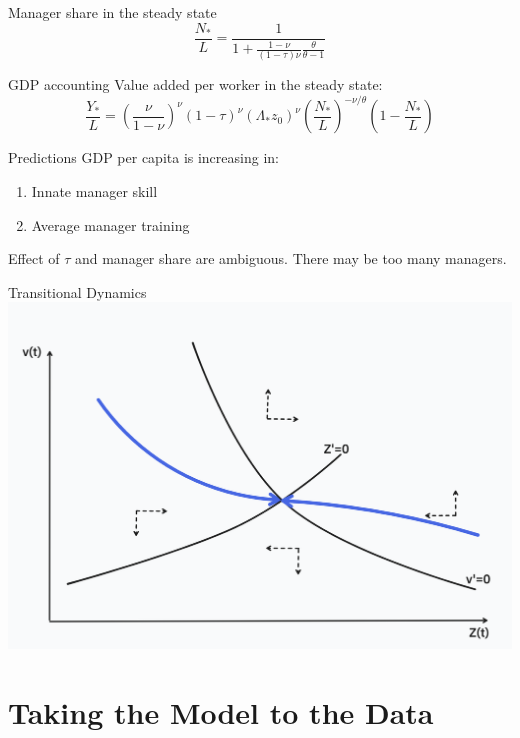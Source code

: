 \documentclass[
  ignorenonframetext,
  aspectratio=1610,
]{beamer}
\providecommand{\tightlist}{%
  \setlength{\itemsep}{0pt}\setlength{\parskip}{0pt}}
\begin{document}
\begin{frame}{Manager share in the steady state}
\protect\hypertarget{manager-share-in-the-steady-state}{}
\[
\frac{N_*}{L} = \frac 1{1+  
\frac {1-\nu}{(1-\tau)\nu}
\frac {\theta}{\theta - 1}}
\]
\end{frame}

\begin{frame}{GDP accounting}
\protect\hypertarget{gdp-accounting}{}
Value added per worker in the steady state: \[
\frac{Y_*}{L} = 
\left(\frac{\nu}{1-\nu} \right)^\nu
(1-\tau)^\nu
(\Lambda_* z_0)^\nu
\left(\frac {N_*}{L}
\right)^{-\nu/\theta}
\left(1-\frac {N_*}{L}
\right)
\]
\end{frame}

\begin{frame}{Predictions}
\protect\hypertarget{predictions}{}
GDP per capita is increasing in:

\begin{enumerate}
\tightlist
\item
  Innate manager skill
\item
  Average manager training
\end{enumerate}

Effect of \(\tau\) and manager share are ambiguous. There may be too
many managers.
\end{frame}

\begin{frame}{Transitional Dynamics}
\protect\hypertarget{transitional-dynamics}{}
\includegraphics{fig/phase1.png}
\end{frame}

\section{Taking the Model to the
Data}\label{taking-the-model-to-the-data}
\end{document}
